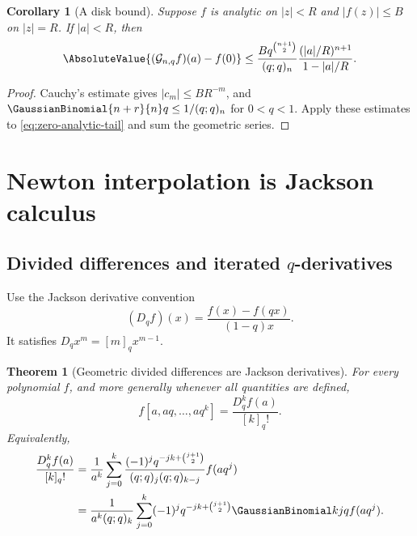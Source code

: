 \documentclass[11pt,a4paper,oneside]{article}
\newtheorem{theorem}{Theorem}[section]
\newtheorem{corollary}[corollary]{Corollary}
\theoremstyle{definition}
\theoremstyle{remark}
\newcommand{\Gop}{\mathcal G}
\begin{document}
\begin{corollary}[A disk bound]
\label{cor:disk-bound}
Suppose $f$ is analytic on $|z|<R$ and $|f(z)|\le B$ on $|z|=R$.  If
$|a|<R$, then
\begin{equation}
 \AbsoluteValue{(\Gop_{n,q}f)(a)-f(0)}
 \le
 \frac{Bq^{\binom{n+1}{2}}}{(q;q)_n}
 \frac{(|a|/R)^{n+1}}{1-|a|/R}.
 \label{eq:disk-filter-bound}
\end{equation}
\end{corollary}

\begin{proof}
Cauchy's estimate gives $|c_m|\le BR^{-m}$, and
$\GaussianBinomial{n+r}{n}q\le1/(q;q)_n$ for $0<q<1$.  Apply these estimates to
\eqref{eq:zero-analytic-tail} and sum the geometric series.
\end{proof}

\section{Newton interpolation is Jackson calculus}
\label{sec:jackson}

\subsection{Divided differences and iterated \texorpdfstring{$q$}{q}-derivatives}

Use the Jackson derivative convention
\begin{equation}
 (D_qf)(x)=\frac{f(x)-f(qx)}{(1-q)x}.
 \label{eq:jackson-definition}
\end{equation}
It satisfies $D_qx^m=[m]_qx^{m-1}$.

\begin{theorem}[Geometric divided differences are Jackson derivatives]
\label{thm:jackson-divided}
For every polynomial $f$, and more generally whenever all quantities are
defined,
\begin{equation}
 f[a,aq,\ldots,aq^k]
 =\frac{D_q^kf(a)}{[k]_q!}.
 \label{eq:jackson-divided}
\end{equation}
Equivalently,
\begin{align}
 \frac{D_q^kf(a)}{[k]_q!}
 &=\frac1{a^k}
 \sum_{j=0}^k
 \frac{(-1)^jq^{-jk+\binom{j+1}{2}}}
 {(q;q)_j(q;q)_{k-j}}f(aq^j)
 \label{eq:jackson-explicit}\\
 &=\frac1{a^k(q;q)_k}
 \sum_{j=0}^k(-1)^jq^{-jk+\binom{j+1}{2}}
 \GaussianBinomial kjq f(aq^j).
 \label{eq:jackson-explicit-qbinom}
\end{align}
\end{theorem}
\end{document}
